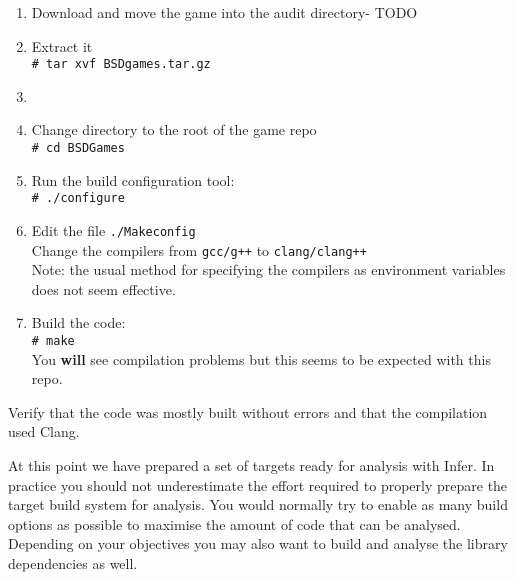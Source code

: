 
\begin{enumerate}
	\itemsep0em
	\item Download and move the game into the audit directory- TODO 
	\item Extract it\\
	\verb|# tar xvf BSDgames.tar.gz|
	\item {}
	\item Change directory to the root of the game repo	\\
	\verb|# cd BSDGames|	
	\item Run the build configuration tool:\\
	\verb|# ./configure|
	\item Edit the file \verb|./Makeconfig|\\
	Change the compilers from \verb|gcc/g++| to \verb|clang/clang++|\\
	Note: the usual method for specifying the compilers as environment variables does not seem effective.
	\item Build the code:\\
	\verb|# make |\\
	You \textbf{will} see compilation problems but this seems to be expected with this repo.
\end{enumerate}

Verify that the code was mostly built without errors and that the compilation used Clang.

\vspace{1cm}

At this point we have prepared a set of targets ready for analysis with Infer.
In practice you should not underestimate the effort required to properly prepare
the target build system for analysis. 
You would normally try to enable as many build options
as possible to maximise the amount of code that can be analysed. 
Depending on your objectives you may also want to build and analyse the library dependencies as well.

